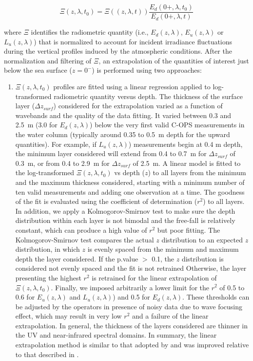 \documentclass[essd, manuscript]{copernicus}
\begin{document}
\begin{equation}
\Xi(z,\lambda,t_0) = \Xi((z,\lambda,t))\frac{E_d(0+,\lambda,t_0)}{E_d(0+,\lambda,t)}
\label{eq:xi}
\end{equation}

where $\Xi$ identifies the radiometric quantity (i.e., $E_d(z,\lambda)$, $E_u(z,\lambda)$ or $L_u(z,\lambda)$) that is normalized to account for incident irradiance fluctuations during the vertical profiles induced by the atmospheric conditions. After the normalization and filtering of $\Xi$, an extrapolation of the quantities of interest just below the sea surface ($z=0^-$) is performed using two approaches: 

\begin{enumerate}
    \item $\Xi(z,\lambda,t_0)$ profiles are fitted using a linear regression applied to log-transformed radiometric quantity versus depth. The thickness of the surface layer ($\Delta z_{surf}$) considered for the extrapolation varied as a function of wavebands and the quality of the data fitting. It varied between 0.3 and 2.5~m (3.0 for $E_d(z,\lambda)$) below the very first valid C-OPS measurements in the water column (typically around 0.35 to 0.5~m depth for the upward quantities). For example, if $L_u(z,\lambda)$) measurements begin at 0.4 m depth, the minimum layer considered will extend from 0.4 to 0.7~m for $\Delta z_{surf}$ of 0.3~m, or from 0.4 to 2.9~m for $\Delta z_{surf}$ of 2.5~m. A linear model is fitted to the log-transformed $\Xi(z,\lambda,t_0)$ vs depth ($z$) to all layers from the minimum and the maximum thickness considered, starting with a minimum number of ten valid measurements and adding one observation at a time. The goodness of the fit is evaluated using the coefficient of determination ($r^2$) to all layers. In addition, we apply a Kolmogorov-Smirnov test to make sure the depth distribution within each layer is not bimodal and the free-fall is relatively constant, which can produce a high value of $r^2$ but poor fitting. The Kolmogorov-Smirnov test compares the actual $z$ distribution to an expected $z$ distribution, in which $z$ is evenly spaced from the minimum and maximum depth the layer considered. If the p.value $>$ 0.1, the $z$ distribution is considered not evenly spaced and the fit is not retrained%
    Otherwise, the layer presenting the highest $r^2$ is retrained for the linear extrapolation of $\Xi(z,\lambda,t_0)$. Finally, we imposed arbitrarily a lower limit for the $r^2$ of 0.5 to 0.6 for $E_u(z,\lambda)$ and $L_u(z,\lambda)$) and 0.5 for $E_d(z,\lambda)$. These thresholds can be adjusted by the operators in presence of noisy data due to wave focusing effect, which may result in very low $r^2$ and a failure of the linear extrapolation. In general, the thickness of the layers considered are thinner in the UV and near-infrared spectral domains. In summary, the linear extrapolation method is similar to that adopted by \citet{Antoine2013a} and was improved relative to that described in \citet{Belanger2017}. 

\end{enumerate}
\end{document}
